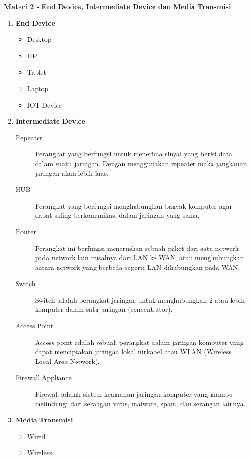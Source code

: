 \documentclass{article}
\begin{document}
    \begin{flushleft}
        \textbf{Materi 2 - End Device, Intermediate Device dan Media Transmisi}
        \newline

        \begin{enumerate}
            \setlength\itemsep{2em}

            \item \textbf{End Device}
            \begin{itemize}
                \item Desktop
                \item HP
                \item Tablet
                \item Laptop
                \item IOT Device
            \end{itemize}

            \item \textbf{Intermediate Device}
            \begin{description}
                \item[Repeater] Perangkat yang berfungsi untuk menerima sinyal yang berisi data dalam suatu jaringan. Dengan menggunakan repeater maka jangkauan jaringan akan lebih luas. 
                \item[HUB] Perangkat yang berfungsi menghubungkan banyak komputer agar dapat saling berkomunikasi dalam jaringan yang sama.
                \item[Router] Perangkat ini berfungsi meneruskan sebuah paket dari satu network pada network lain misalnya dari LAN ke WAN, atau menghubungkan antara network yang berbeda seperti LAN dihubungkan pada WAN.
                \item[Switch] Switch adalah perangkat jaringan untuk menghubungkan 2 atau lebih komputer dalam satu jaringan (concentrator).
                \item[Access Point] Access point adalah sebuah perangkat dalam jaringan komputer yang dapat menciptakan jaringan lokal nirkabel atau WLAN (Wireless Local Area Network).
                \item[Firewall Appliance] Firewall adalah sistem keamanan jaringan komputer yang mampu melindungi dari serangan virus, malware, spam, dan serangan lainnya.
            \end{description}

            \item \textbf{Media Transmisi}
            \begin{itemize}
                \item Wired
                \item Wireless
            \end{itemize}
        \end{enumerate}
    \end{flushleft}
\end{document}
